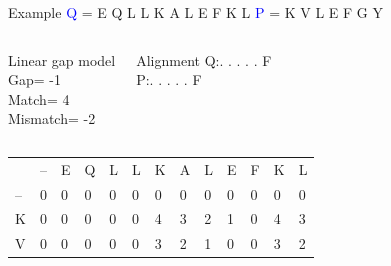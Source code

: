 \documentclass{bredelebeamer}
\begin{document}
 
 \begin{frame}{Example}
 \centering
 \textcolor{blue}{Q} = E Q L L K A L E F K L \quad \textcolor{blue}{P} = K V L E F G Y
\begin{columns}
\begin{block}{Linear gap model} \\
Gap= -1 \\
Match= 4 \\
Mismatch= -2
\end{block}
\begin{block}{Alignment}
Q:\quad . . . . . F \\
P:\quad . . . . . F
\end{block}
\end{columns}

\begin{table}[]
\centering
\begin{tabular}{*{13}{p{0.4cm}}}
                        & --                     & E                      & Q                      & L                      & L                      & K                      & A                      & L                      & E                       & \cellcolor[HTML]{FFFF00}F                                               & K                       & L                       \\ \cline{2-13} 
\multicolumn{1}{l|}{--} & \multicolumn{1}{l|}{0} & \multicolumn{1}{l|}{0} & \multicolumn{1}{l|}{0} & \multicolumn{1}{l|}{0} & \multicolumn{1}{l|}{0} & \multicolumn{1}{l|}{0} & \multicolumn{1}{l|}{0} & \multicolumn{1}{l|}{0} & \multicolumn{1}{l|}{0}  & \multicolumn{1}{l|}{0}                          & \multicolumn{1}{l|}{0}  & \multicolumn{1}{l|}{0}  \\ \cline{2-13} 
\multicolumn{1}{l|}{K}  & \multicolumn{1}{l|}{0} & \multicolumn{1}{l|}{0} & \multicolumn{1}{l|}{0} & \multicolumn{1}{l|}{0} & \multicolumn{1}{l|}{0} & \multicolumn{1}{l|}{4} & \multicolumn{1}{l|}{3} & \multicolumn{1}{l|}{2} & \multicolumn{1}{l|}{1}  & \multicolumn{1}{l|}{0}                          & \multicolumn{1}{l|}{4}  & \multicolumn{1}{l|}{3}  \\ \cline{2-13}  %
\multicolumn{1}{l|}{V}  & \multicolumn{1}{l|}{0} & \multicolumn{1}{l|}{0} & \multicolumn{1}{l|}{0} & \multicolumn{1}{l|}{0} & \multicolumn{1}{l|}{0} & \multicolumn{1}{l|}{3} & \multicolumn{1}{l|}{2} & \multicolumn{1}{l|}{1} & \multicolumn{1}{l|}{0}  & \multicolumn{1}{l|}{0}                          & \multicolumn{1}{l|}{3}  & \multicolumn{1}{l|}{2}  \\ \cline{2-13} 

\end{tabular}
\end{table}
\end{frame}
\end{document}
